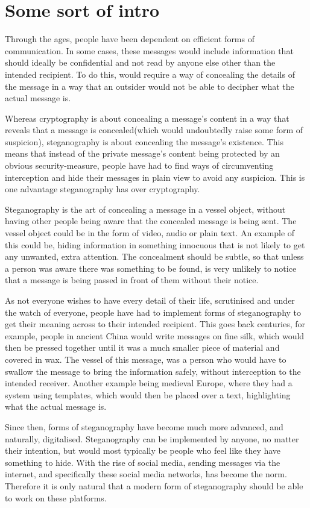 \section{Some sort of intro}
Through the ages, people have been dependent on efficient forms of communication. In some cases, these messages would include information that should ideally be confidential and not read by anyone else other than the intended recipient. To do this, would require a way of concealing the details of the message in a way that an outsider would not be able to decipher what the actual message is.

Whereas cryptography is about concealing a message's content in a way that reveals that a message is concealed(which would undoubtedly raise some form of suspicion), steganography is about concealing the message's existence. This means that instead of the private message's content being protected by an obvious security-measure, people have had to find ways of circumventing interception and hide their messages in plain view to avoid any suspicion. This is one advantage steganography has over cryptography. 

Steganography is the art of concealing a message in a vessel object, without having other people being aware that the concealed message is being sent.\cite{Anderson1998} The vessel object could be in the form of video, audio or plain text. An example of this could be, hiding information in something innocuous that is not likely to get any unwanted, extra attention. The concealment should be subtle, so that unless a person was aware there was something to be found, is very unlikely to notice that a message is being passed in front of them without their notice.

As not everyone wishes to have every detail of their life, scrutinised and under the watch of everyone, people have had to implement forms of steganography to get their meaning across to their intended recipient. This goes back centuries, for example, people in ancient China would write messages on fine silk, which would then be pressed together until it was a much smaller piece of material and covered in wax. The vessel of this message, was a person who would have to swallow the message to bring the information safely, without interception to the intended receiver. \cite{Singh2001} Another example being medieval Europe, where they had a system using templates, which would then be placed over a text, highlighting what the actual message is.\cite{Anderson1998}

Since then, forms of steganography have become much more advanced, and naturally, digitalised. Steganography can be implemented by anyone, no matter their intention, but would most typically be people who feel like they have something to hide. With the rise of social media, sending messages via the internet, and specifically these social media networks, has become the norm. Therefore it is only natural that a modern form of steganography should be able to work on these platforms. 
